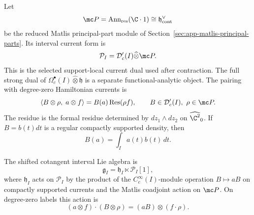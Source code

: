 \begin{defn}
\label{def:app-factorization-current-dual}
  Let
  \[
    \mc P=\operatorname{Ann}_{\mathrm{res}}(\C\cdot1)
      \cong\mathfrak h^\vee_{\mathrm{cont}}
  \]
  be the reduced Matlis principal-part module of
  Section~\ref{sec:app-matlis-principal-parts}.  Its interval current
  form is
  \[
    \mathcal P_I=\mathcal D'_c(I)\widehat\otimes\mc P .
  \]
  This is the selected support-local current dual used after
  contraction.  The full strong dual of
  \(\Omega_c^\bullet(I)\widehat\otimes\mathfrak h\) is a separate
  functional-analytic object.
  The pairing with degree-zero Hamiltonian currents is
  \[
    \langle B\otimes\rho,\;a\otimes f\rangle
      =B(a)\operatorname{Res}(\rho f),
      \qquad
      B\in\mathcal D'_c(I),\ \rho\in\mc P.
  \]
  The residue is the formal residue determined by
  \(dz_1\wedge dz_2\) on \(\widehat{\C^2}_0\).
  If \(B=b(t)dt\) is a regular compactly supported density, then
  \[
    B(a)=\int_Ia(t)b(t)\,dt .
  \]

  The shifted cotangent interval Lie algebra is
  \[
    \mathfrak g_I=\mathfrak h_I\ltimes\mathcal P_I[1],
  \]
  where \(\mathfrak h_I\) acts on \(\mathcal P_I\) by the product of
  the \(C_c^\infty(I)\)-module operation \(B\mapsto aB\) on compactly
  supported currents and the Matlis coadjoint action
  on \(\mc P\).  On degree-zero labels this action is
  \[
    (a\otimes f)\cdot(B\otimes\rho)
      =(aB)\otimes(f\cdot\rho).
  \]
\end{defn}

